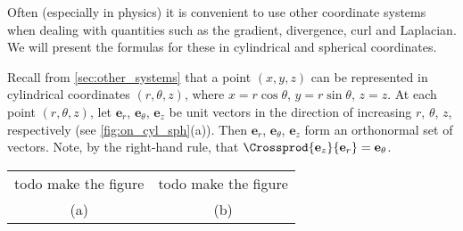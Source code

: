 
Often (especially in physics) it is convenient to use other coordinate systems when dealing with quantities such as the gradient, divergence, curl and Laplacian. We will present the formulas for these in cylindrical and spherical coordinates.

Recall from \autoref{sec:other_systems} that a point $(x,y,z)$ can be represented in cylindrical coordinates $(r, \theta , z)$, where $x=r\cos \theta$, $y=r\sin \theta$, $z=z$. At each point $(r, \theta , z)$, let $\textbf{e}_{r}$, $\textbf{e}_{\theta}$, $\textbf{e}_{z}$ be unit vectors in the direction of increasing $r$, $\theta$, $z$, respectively (see \autoref{fig:on_cyl_sph}(a)). Then $\textbf{e}_{r}$, $\textbf{e}_{\theta}$, $\textbf{e}_{z}$ form an orthonormal set of vectors. Note, by the right-hand rule, that $\Crossprod{\textbf{e}_{z}}{\textbf{e}_{r}}=\textbf{e}_{\theta}$.

\begin{lxfigure}
 \begin{center}
 \begin{tabular}{cc}
  todo make the figure &
  todo make the figure
  \\
  (a)
  &
  (b)
  \end{tabular}
  \label{fig:on_cyl_sph}
  \end{center}
\end{lxfigure}


